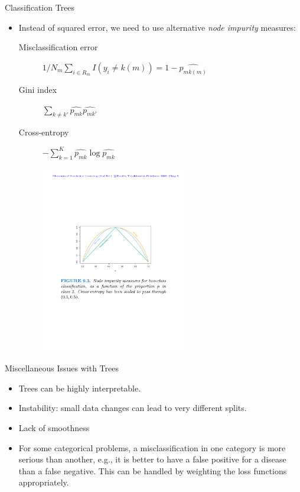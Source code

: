 \documentclass{beamer}
\begin{document}
\begin{frame}{Classification Trees}
    \begin{itemize}
        \item Instead of squared error, we need to use alternative \textit{node impurity} measures: 
        \begin{description}
        \item[Misclassification error] $1/N_m \sum_{i \in R_m} I(y_i \neq k(m)) = 1-\hat{p_{mk(m)}}$
        \item[Gini index] $\sum_{k \neq k'} \hat{p_{mk}}\hat{p_{mk'}}$
        \item[Cross-entropy] $-\sum_{k =1}^K \hat{p_{mk}}\log{\hat{p_{mk}}}$
        \end{description}
        \begin{figure}
            \centering
            \includegraphics[width=0.6\textwidth]{figures/node-impurity-measures.pdf}
        \end{figure}
    \end{itemize}
\end{frame}


\begin{frame}{Miscellaneous Issues with Trees}
    \begin{itemize}
        \item Trees can be highly interpretable.
        \item Instability: small data changes can lead to very different splits.
        \item Lack of smoothness
        \item For some categorical problems, a misclassification in one category is more serious than another, e.g., it is better to have a false positive for a disease than a false negative. This can be handled by weighting the loss functions appropriately.
    \end{itemize}
\end{frame}
\end{document}
